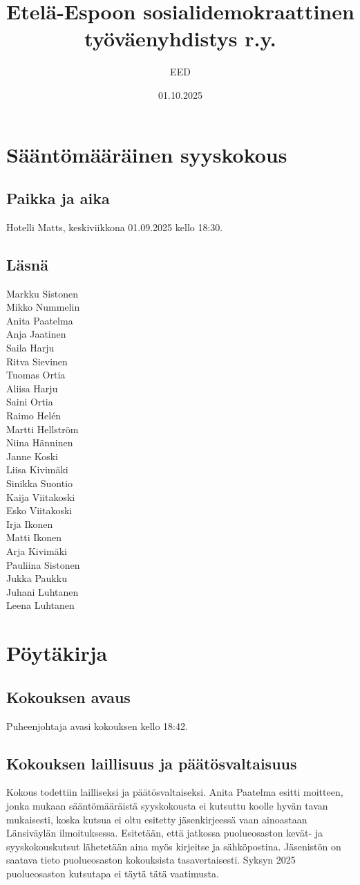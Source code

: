 \documentclass[a4paper,12pt]{article}
\title{Etelä-Espoon sosialidemokraattinen työväenyhdistys r.y.}
\author{EED}
\date{01.10.2025}
\begin{document}
\maketitle
\tableofcontents
\section*{Sääntömääräinen syyskokous}
\subsection*{Paikka ja aika}
Hotelli Matts, keskiviikkona 01.09.2025 kello 18:30.
\subsection*{Läsnä}
Markku Sistonen \\
Mikko Nummelin \\
Anita Paatelma \\
Anja Jaatinen \\
Saila Harju \\
Ritva Sievinen \\
Tuomas Ortia \\
Aliisa Harju \\
Saini Ortia \\
Raimo Helén \\
Martti Hellström \\
Niina Hänninen \\
Janne Koski \\
Liisa Kivimäki \\
Sinikka Suontio \\
Kaija Viitakoski \\
Esko Viitakoski \\
Irja Ikonen \\
Matti Ikonen \\
Arja Kivimäki \\
Pauliina Sistonen \\
Jukka Paukku \\
Juhani Luhtanen \\
Leena Luhtanen
\section*{Pöytäkirja}
\subsection{Kokouksen avaus}
Puheenjohtaja avasi kokouksen kello 18:42.
\subsection{Kokouksen laillisuus ja päätösvaltaisuus}
Kokous todettiin lailliseksi ja päätösvaltaiseksi. Anita Paatelma esitti moitteen, jonka mukaan sääntömääräistä syyskokousta ei kutsuttu koolle hyvän tavan mukaisesti, koska kutsua ei oltu esitetty jäsenkirjeessä vaan ainoastaan Länsiväylän ilmoituksessa. Esitetään, että jatkossa puolueosaston kevät- ja syyskokouskutsut lähetetään aina myös kirjeitse ja sähköpostina. Jäsenistön on saatava tieto puolueosaston kokouksista tasavertaisesti. Syksyn 2025 puolueosaston kutsutapa ei täytä tätä vaatimusta.
\end{document}
